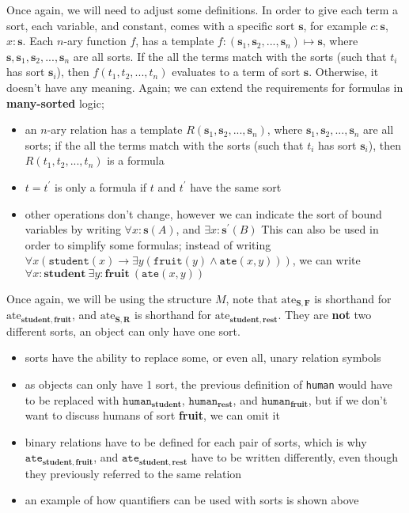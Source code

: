 \documentclass[a4paper, 12pt]{article}
\begin{document}
                Once again, we will need to adjust some definitions. In order to give each term a sort, each variable, and constant, comes with a specific sort $\mathbf{s}$, for example $c : \mathbf{s}$, $x : \mathbf{s}$. Each $n$-ary function $f$, has a template $f: (\mathbf{s}_1, \mathbf{s}_2, ..., \mathbf{s}_n) \mapsto \mathbf{s}$, where $\mathbf{s}, \mathbf{s}_1, \mathbf{s}_2, ..., \mathbf{s}_n$ are all sorts. If the all the terms match with the sorts (such that $t_i$ has sort $\mathbf{s}_i$), then $f(t_1, t_2, ..., t_n)$ evaluates to a term of sort $\mathbf{s}$. Otherwise, it doesn't have any meaning. Again; we can extend the requirements for formulas in \textbf{many-sorted} logic;
                \begin{itemize}
                    \itemsep0em
                    \item an $n$-ary relation has a template $R(\mathbf{s}_1, \mathbf{s}_2, ..., \mathbf{s}_n)$, where $\mathbf{s}_1, \mathbf{s}_2, ..., \mathbf{s}_n$ are all sorts; if the all the terms match with the sorts (such that $t_i$ has sort $\mathbf{s}_i$), then $R(t_1, t_2, ..., t_n)$ is a formula
                    \item $t = t^\prime$ is only a formula if $t$ and $t^\prime$ have the same sort
                    \item other operations don't change, however we can indicate the sort of bound variables by writing $\forall x : \mathbf{s} (A)$, and $\exists x : \mathbf{s}^\prime (B)$
                        \subitem This can also be used in order to simplify some formulas; instead of writing $\forall x (\texttt{student}(x) \rightarrow \exists y (\texttt{fruit}(y) \land \texttt{ate}(x, y)))$, we can write $\forall x : \mathbf{student}\ \exists y : \mathbf{fruit}\ (\texttt{ate}(x, y))$
                \end{itemize}
                Once again, we will be using the structure $M$, note that $\text{ate}_\mathbf{S, F}$ is shorthand for $\text{ate}_\mathbf{student, fruit}$, and $\text{ate}_\mathbf{S, R}$ is shorthand for $\text{ate}_\mathbf{student, rest}$. They are \textbf{not} two different sorts, an object can only have one sort.
                \begin{itemize}
                    \itemsep0em
                    \item sorts have the ability to replace some, or even all, unary relation symbols
                    \item as objects can only have 1 sort, the previous definition of \texttt{human} would have to be replaced with $\texttt{human}_\mathbf{student}$, $\texttt{human}_\mathbf{rest}$, and $\texttt{human}_\mathbf{fruit}$, but if we don't want to discuss humans of sort \textbf{fruit}, we can omit it
                    \item binary relations have to be defined for each pair of sorts, which is why $\texttt{ate}_\mathbf{student, fruit}$, and  $\texttt{ate}_\mathbf{student, rest}$ have to be written differently, even though they previously referred to the same relation
                    \item an example of how quantifiers can be used with sorts is shown above
                \end{itemize}
\end{document}
